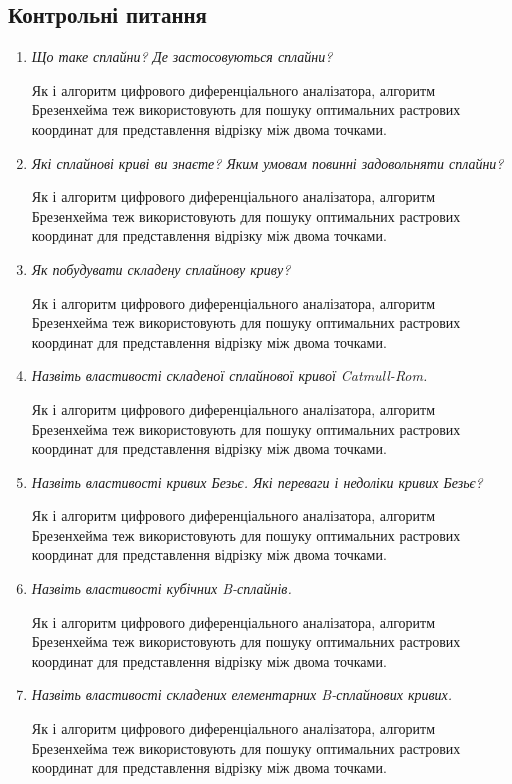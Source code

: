 \documentclass[a4paper,14pt]{extarticle} %
\begin{document}
\subsection*{Контрольні питання}

\begin{enumerate}

    \item \textit{Що таке сплайни? Де застосовуються сплайни?}

    Як і алгоритм цифрового диференціального аналізатора, алгоритм Брезенхейма теж використовують для пошуку 
    оптимальних растрових координат для представлення відрізку між двома точками.

    \item \textit{Які сплайнові криві ви знаєте? Яким умовам повинні задовольняти сплайни?}

    Як і алгоритм цифрового диференціального аналізатора, алгоритм Брезенхейма теж використовують для пошуку 
    оптимальних растрових координат для представлення відрізку між двома точками.

    \item \textit{Як побудувати складену сплайнову криву?}

    Як і алгоритм цифрового диференціального аналізатора, алгоритм Брезенхейма теж використовують для пошуку 
    оптимальних растрових координат для представлення відрізку між двома точками.

    \item \textit{Назвіть властивості складеної сплайнової кривої Catmull-Rom.}

    Як і алгоритм цифрового диференціального аналізатора, алгоритм Брезенхейма теж використовують для пошуку 
    оптимальних растрових координат для представлення відрізку між двома точками.

    \item \textit{Назвіть властивості кривих Безьє. Які переваги і недоліки кривих Безьє?}
    
    Як і алгоритм цифрового диференціального аналізатора, алгоритм Брезенхейма теж використовують для пошуку 
    оптимальних растрових координат для представлення відрізку між двома точками.
    
    \item \textit{Назвіть властивості кубічних B-сплайнів.}
    
    Як і алгоритм цифрового диференціального аналізатора, алгоритм Брезенхейма теж використовують для пошуку 
    оптимальних растрових координат для представлення відрізку між двома точками.

    \item \textit{Назвіть властивості складених елементарних B-сплайнових кривих.}
    
    Як і алгоритм цифрового диференціального аналізатора, алгоритм Брезенхейма теж використовують для пошуку 
    оптимальних растрових координат для представлення відрізку між двома точками.

\end{enumerate}
\end{document}
